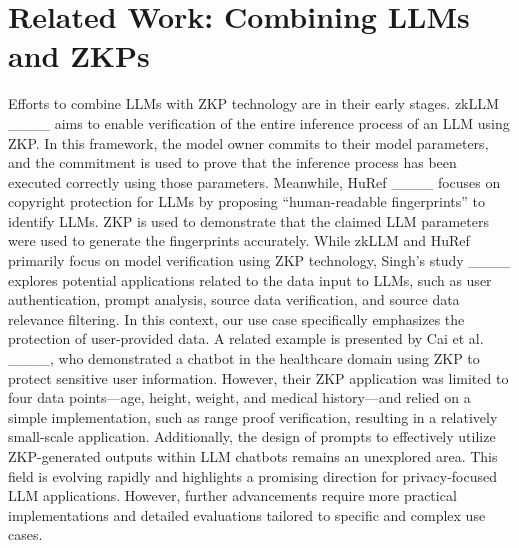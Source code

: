 \section{Related Work: Combining LLMs and ZKPs}
Efforts to combine LLMs with ZKP technology are in their early stages. zkLLM ____ aims to enable verification of the entire inference process of an LLM using ZKP. In this framework, the model owner commits to their model parameters, and the commitment is used to prove that the inference process has been executed correctly using those parameters. Meanwhile, HuRef ____ focuses on copyright protection for LLMs by proposing “human-readable fingerprints” to identify LLMs. ZKP is used to demonstrate that the claimed LLM parameters were used to generate the fingerprints accurately. While zkLLM and HuRef primarily focus on model verification using ZKP technology, Singh’s study ____ explores potential applications related to the data input to LLMs, such as user authentication, prompt analysis, source data verification, and source data relevance filtering. In this context, our use case specifically emphasizes the protection of user-provided data. A related example is presented by Cai et al. ____, who demonstrated a chatbot in the healthcare domain using ZKP to protect sensitive user information. However, their ZKP application was limited to four data points—age, height, weight, and medical history—and relied on a simple implementation, such as range proof verification, resulting in a relatively small-scale application. Additionally, the design of prompts to effectively utilize ZKP-generated outputs within LLM chatbots remains an unexplored area. This field is evolving rapidly and highlights a promising direction for privacy-focused LLM applications. However, further advancements require more practical implementations and detailed evaluations tailored to specific and complex use cases.

